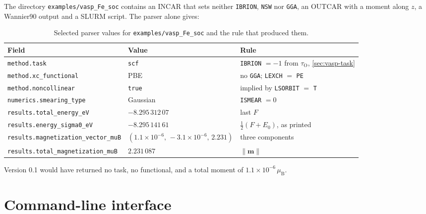 \documentclass[11pt,a4paper]{article}
\newcommand{\vtag}[1]{\texttt{#1}}
\newcommand{\code}[1]{\texttt{#1}}
\begin{document}
The directory \code{examples/vasp\_Fe\_soc} contains an INCAR that sets neither \vtag{IBRION}, \vtag{NSW} nor
\vtag{GGA}, an OUTCAR with a moment along \(z\), a Wannier90 output and a SLURM script. The parser alone gives:

\begin{table}[h]
\centering\small
\caption{Selected parser values for \code{examples/vasp\_Fe\_soc} and the rule that produced them.}
\begin{tabularx}{\linewidth}{@{}llX@{}}
\toprule
\headfont Field & \headfont Value & \headfont Rule \\
\midrule
\code{method.task} & \texttt{scf} & \vtag{IBRION} \(=-1\) from \(\tau_{\mathrm O}\), \cref{sec:vasp-task} \\
\code{method.xc\_functional} & PBE & no \vtag{GGA}; \vtag{LEXCH} \(=\) \texttt{PE} \\
\code{method.noncollinear} & \texttt{true} & implied by \vtag{LSORBIT} \(=\) \texttt{T} \\
\code{numerics.smearing\_type} & Gaussian & \vtag{ISMEAR} \(=0\) \\
\code{results.total\_energy\_eV} & \(-8.295\,312\,07\) & last \(F\) \\
\code{results.energy\_sigma0\_eV} & \(-8.295\,141\,61\) & \(\tfrac12(F+E_0)\), as printed \\
\code{results.magnetization\_vector\_muB} & \((1.1\!\times\!10^{-6},\,-3.1\!\times\!10^{-6},\,2.231)\) & three components \\
\code{results.total\_magnetization\_muB} & \(2.231\,087\) & \(\lVert\mathbf m\rVert\) \\
\bottomrule
\end{tabularx}
\end{table}

\noindent Version 0.1 would have returned no task, no functional, and a total moment of \(1.1\times10^{-6}\,\mu_{\mathrm B}\).

\section{Command-line interface}
\end{document}
